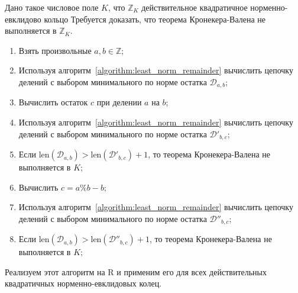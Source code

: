 \documentclass[_00_dissertation.tex]{subfiles}
\begin{document}
\begin{algorithm}\label{algorithm:kronecker_vahlen_special}
    Дано такое числовое поле $K$, что $\mathbb{Z}_K$ действительное квадратичное норменно-евклидово кольцо
    Требуется доказать, что теорема Кронекера-Валена не выполняется в $\mathbb{Z}_K$.

    \begin{enumerate}
        \item Взять произвольные $a, b \in \mathbb{Z}$;

        \item Используя алгоритм~\ref{algorithm:least_norm_remainder} вычислить цепочку делений с выбором минимального по норме остатка $\mathcal{D}_{a,b}$;

        \item Вычислить остаток $c$ при делении $a$ на $b$;

        \item Используя алгоритм~\ref{algorithm:least_norm_remainder} вычислить цепочку делений с выбором минимального по норме остатка $\mathcal{D}'_{b, c}$;

        \item Если $\textrm{len}(\mathcal{D}_{a, b}) > \textrm{len}(\mathcal{D}'_{b, c}) + 1$, то теорема Кронекера-Валена не выполняется в $K$;

        \item Вычислить $c = a \% b - b$;

        \item Используя алгоритм~\ref{algorithm:least_norm_remainder} вычислить цепочку делений с выбором минимального по норме остатка $\mathcal{D}''_{b,c}$;

        \item Если $\textrm{len}(\mathcal{D}_{a, b}) > \textrm{len}(\mathcal{D}''_{b, c}) + 1$, то теорема Кронекера-Валена не выполняется в $K$;
    \end{enumerate}
\end{algorithm}

Реализуем этот алгоритм на R и применим его для всех действительных квадратичных норменно-евклидовых колец.
\end{document}
